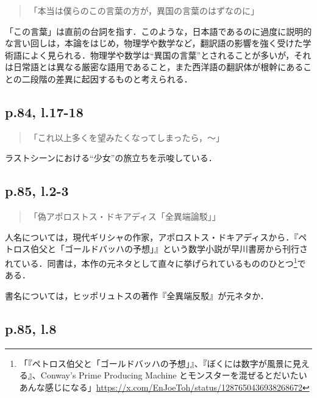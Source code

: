 \documentclass[10pt, a5paper, twoside]{jsarticle}
\theoremstyle{definition}
\begin{document}
			\begin{quote}

				「本当は僕らのこの言葉の方が，異国の言葉のはずなのに」
				
			\end{quote}

			「この言葉」は直前の台詞を指す．このような，日本語であるのに過度に説明的な言い回しは，本論をはじめ，物理学や数学など，翻訳語の影響を強く受けた学術語によく見られる．物理学や数学は“異国の言葉”とされることが多いが，それは日常語とは異なる厳密な語用であること，また西洋語の翻訳体が根幹にあることの二段階の差異に起因するものと考えられる．

		\subsection{p.84, l.17-18}

			\begin{quote}

				「これ以上多くを望みたくなってしまったら，〜」
				
			\end{quote}

			ラストシーンにおける“少女”の旅立ちを示唆している．

		\subsection{p.85, l.2-3}

			\begin{quote}

				「偽アポロストス・ドキアディス「全異端論駁」」

			\end{quote}

			人名については，現代ギリシャの作家，アポロストス・ドキアディスから．『ペトロス伯父と「ゴールドバッハの予想」』\cite{gr}という数学小説が早川書房から刊行されている．同書は，本作の元ネタとして直々に挙げられているもののひとつ\footnote{「『ペトロス伯父と「ゴールドバッハの予想」』、『ぼくには数字が風景に見える』、Conway's Prime Producing Machine とモンスターを混ぜるとだいたいあんな感じになる」\url{https://x.com/EnJoeToh/status/1287650436938268672}}である．

			書名については，ヒッポリュトスの著作『全異端反駁』\cite{papa}が元ネタか．

		\subsection{p.85, l.8}
\end{document}
